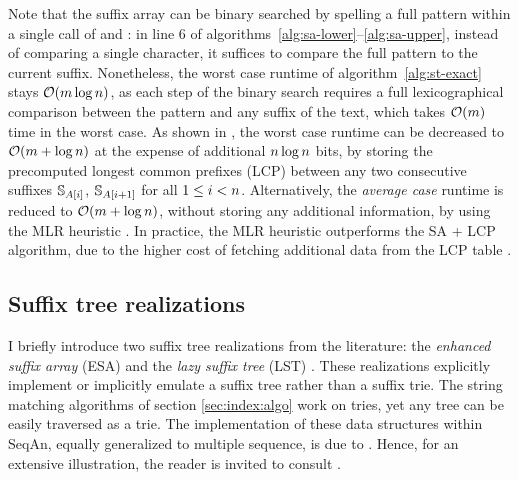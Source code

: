 Note that the suffix array can be binary searched by spelling a full pattern within a single call of  and : in line 6 of algorithms~\ref{alg:sa-lower}--\ref{alg:sa-upper}, instead of comparing a single character, it suffices to compare the full pattern to the current suffix.
Nonetheless, the worst case runtime of algorithm~\ref{alg:st-exact} stays $\mathcal{O}(m \log{n})$, as each step of the binary search requires a full lexicographical comparison between the pattern and any suffix of the text, which takes $\mathcal{O}(m)$ time in the worst case.
As shown in \citep{Manber1990}, the worst case runtime can be decreased to $\mathcal{O}(m + \log{n})$ at the expense of additional $n \log{n}$ bits, by storing the precomputed longest common prefixes (LCP) between any two consecutive suffixes ${\mathbb{S}}_{A\left[i\right]}$, ${\mathbb{S}}_{A\left[i+1\right]}$ for all $1 \leq i < n$.
Alternatively, the \emph{average case} runtime is reduced to $\mathcal{O}(m + \log{n})$, without storing any additional information, by using the MLR heuristic \citep{Manber1990}.
In practice, the MLR heuristic outperforms the SA + LCP algorithm, due to the higher cost of fetching additional data from the LCP table \citep{Weese2013}.


\subsection{Suffix tree realizations}
\label{sec:index:stree}

I briefly introduce two suffix tree realizations from the literature: the \emph{enhanced suffix array} (ESA) \citep{Abouelhoda2004} and the \emph{lazy suffix tree} (LST) \citep{Giegerich2003}.
These realizations explicitly implement or implicitly emulate a suffix tree rather than a suffix trie.
The string matching algorithms of section \ref{sec:index:algo} work on tries, yet any tree can be easily traversed as a trie.
The implementation of these data structures within SeqAn, equally generalized to multiple sequence, is due to \citeauthor{Weese2013}.
Hence, for an extensive illustration, the reader is invited to consult \citep{Weese2013}.

